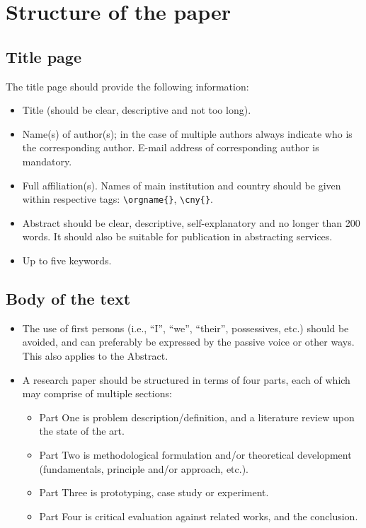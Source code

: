 \documentclass[bsi]{iosart2x}
\begin{document}
\section{Structure of the paper}
\subsection{Title page}

The title page should provide the following information:

\begin{itemize}
\item Title (should be clear, descriptive and not too long).
\item  Name(s) of author(s); in the case of multiple authors always indicate who is the corresponding
author. E-mail address of corresponding author is mandatory.
\item  Full affiliation(s). Names of main institution and country should be given within respective tags: \verb|\orgname{}|, \verb|\cny{}|.
\item  Abstract should be clear, descriptive, self-expla\-na\-tory and no longer than 200
words. It should also be suitable for publication in abstracting services.
\item  Up to five keywords.
\end{itemize}

\subsection{Body of the text}
\begin{itemize}
\item The use of first persons (i.e., ``I'', ``we'', ``their'', possessives, etc.) should be avoided,
and can preferably be expressed by the passive voice or other ways. This also applies to the Abstract.
\item A research paper should be structured in terms of four parts, each of which may comprise of multiple sections:
\begin{itemize}
\item Part One is problem description/definition, and a literature review upon the state of the
art.
\item Part Two is methodological formulation and/or theoretical development (fundamentals, principle and/or approach,
etc.).
\item Part Three is prototyping, case study or experiment.
\item Part Four is critical evaluation against related works, and the
conclusion.
\end{itemize}
\end{itemize}
\end{document}
